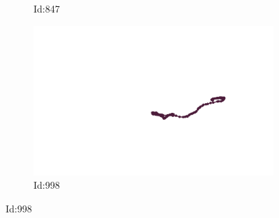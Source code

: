 \documentclass[12pt,twoside]{report}
\begin{document}
\begin{figure}
\begin{subfigure}[b]{0.20\textwidth}
\caption{Id:847}
\end{subfigure}
\begin{subfigure}[b]{0.20\textwidth}
\centering
\includegraphics[width=\textwidth]{../../trajectories/998.png}
\caption{Id:998}
\end{subfigure}
\end{figure}
\end{document}
